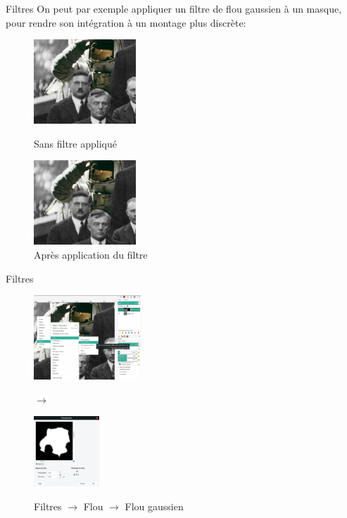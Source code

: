 \documentclass[10pt,svgnames,usenames,table]{beamer}
\begin{document}
\begin{frame}{Filtres}
		On peut par exemple appliquer un filtre de flou gaussien à un masque, pour rendre son intégration à un montage plus discrète:
		\begin{figure}[H]
			\centering
			\begin{minipage}{.5\textwidth}
				\centering
				\includegraphics[height=120px]{Images/filters/astro0} 
				\caption{Sans filtre appliqué}
			\end{minipage}%
			\begin{minipage}{.5\textwidth}
				\centering
				\includegraphics[height=120px]{Images/filters/astro1} 
				\caption{Après application du filtre}
			\end{minipage}
		\end{figure}	
\end{frame}	


	\begin{frame}{Filtres}
		\begin{figure}[H]
			\centering
			\begin{minipage}{.6\textwidth}
				\centering
				\includegraphics[height=120px]{Images/filters/astroBlur} 
				\end{minipage}$\rightarrow$%
			\begin{minipage}{.4\textwidth}
				\centering
				\includegraphics[height=100px]{Images/filters/gaussBlur} 
				\end{minipage}

Filtres $\rightarrow$ Flou $\rightarrow$ Flou gaussien
			\end{figure}	
	\end{frame}
\end{document}
